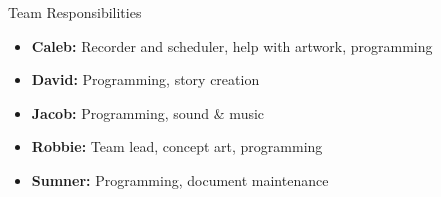 \documentclass{teamepsilon}
\begin{document}
\begin{frame}{Team Responsibilities}
    \begin{itemize}
        \item \textbf{Caleb:} Recorder and scheduler, help with artwork,
        programming
        \item \textbf{David:} Programming, story creation
        \item \textbf{Jacob:} Programming, sound \& music
        \item \textbf{Robbie:} Team lead, concept art, programming
        \item \textbf{Sumner:} Programming, document maintenance
    \end{itemize}
\end{frame}
\end{document}

